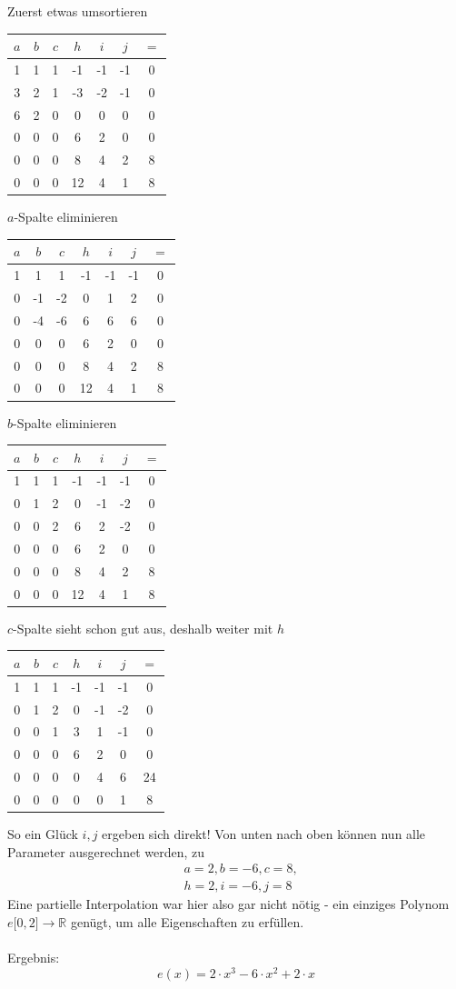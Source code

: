 Zuerst etwas umsortieren
\begin{center}
\begin{tabular}{ccccccc}
$a$&$b$&$c$&$h$&$i$&$j$&$=$ \\
\hline
1&1&1&-1&-1&-1&0 \\
3&2&1&-3&-2&-1&0 \\
6&2&0&0&0&0&0 \\
0&0&0&6&2&0&0 \\
0&0&0&8&4&2&8 \\
0&0&0&12&4&1&8
\end{tabular}
\end{center}
$a$-Spalte eliminieren
\begin{center}
\begin{tabular}{ccccccc}
$a$&$b$&$c$&$h$&$i$&$j$&$=$\\
\hline
1&1&1&-1&-1&-1&0 \\
0&-1&-2&0&1&2&0 \\
0&-4&-6&6&6&6&0 \\
0&0&0&6&2&0&0 \\
0&0&0&8&4&2&8 \\
0&0&0&12&4&1&8
\end{tabular}
\end{center}
$b$-Spalte eliminieren
\begin{center}
\begin{tabular}{ccccccc}
$a$&$b$&$c$&$h$&$i$&$j$&$=$\\
\hline
1&1&1&-1&-1&-1&0 \\
0&1&2&0&-1&-2&0 \\
0&0&2&6&2&-2&0 \\
0&0&0&6&2&0&0 \\
0&0&0&8&4&2&8 \\
0&0&0&12&4&1&8
\end{tabular}
\end{center}
$c$-Spalte sieht schon gut aus, deshalb weiter mit $h$
\begin{center}
\begin{tabular}{ccccccc}
$a$&$b$&$c$&$h$&$i$&$j$&$=$ \\
\hline
1&1&1&-1&-1&-1&0 \\
0&1&2&0&-1&-2&0 \\
0&0&1&3&1&-1&0 \\
0&0&0&6&2&0&0 \\
0&0&0&0&4&6&24 \\
0&0&0&0&0&1&8 \\
\end{tabular}
\end{center}
So ein Glück $i,j$ ergeben sich direkt! Von unten nach oben können nun alle Parameter ausgerechnet werden, zu
\begin{align}
&a=2,b=-6,c=8,\\
&h=2,i=-6,j=8
\end{align}
Eine partielle Interpolation war hier also gar nicht nötig - ein einziges Polynom $e\mathopen[0,2\mathclose]\rightarrow \mathbb{R}$ genügt, um alle Eigenschaften zu erfüllen.\\
\\
Ergebnis:
$$e(x)=2 \cdot x^3-6 \cdot x^2+2 \cdot x$$

